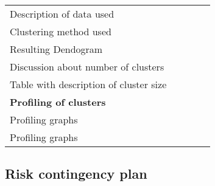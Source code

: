 \begin{table}[H]
\begin{tabular}{@{}l|c|c|c|c@{}}
Description of data used                        &\x  & \X &    &    \\
Clustering method used                          & \X &\x  &    &    \\
Resulting Dendogram                             &    &    &\X   &\x  \\
Discussion about number of clusters             &\x  &\X  &    &    \\
Table with description of cluster size          &\x  &    &\X  &    \\ \midrule
\textbf{Profiling of clusters}                  &    &    &    & \\ 
Profiling graphs                                &    &    &\X  &\x  \\
Profiling graphs                                &    &\x  &    & \X \\ \bottomrule
\end{tabular}
\end{table}

\subsection{Risk contingency plan}%
\label{sub:risk_contingency_plan}


